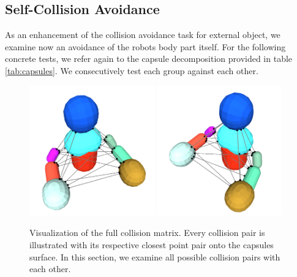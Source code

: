 \subsection{Self-Collision Avoidance}
As an enhancement of the collision avoidance task for external object, we examine now an avoidance of the robots body part itself. For the following concrete tests, we refer again to the capsule decomposition provided in table \ref{tab:capsules}. We consecutively test each group against each other. 
\begin{figure}[h!]
  \centering
    \includegraphics[width=0.48\textwidth]{../figures/closest_points_front.png}
    \includegraphics[width=0.48\textwidth]{../figures/closest_points_side.png}
    \caption{Visualization of the full collision matrix. Every collision pair is illustrated with its respective closest point pair onto the capsules surface. In this section, we examine all possible collision pairs with each other.}
    \label{fig:capsuleclosestpoint}
\end{figure}


